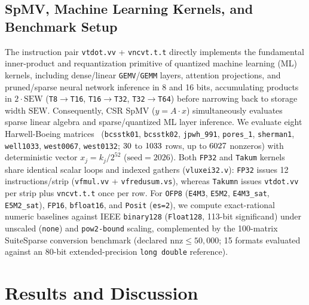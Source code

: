 \documentclass[conference]{IEEEtran}
\begin{document}
\subsection{SpMV, Machine Learning Kernels, and Benchmark Setup}
The instruction pair \texttt{vtdot.vv} + \texttt{vncvt.t.t} directly implements the fundamental inner-product and requantization primitive of quantized machine learning (ML) kernels, including dense/linear \texttt{GEMV}/\texttt{GEMM} layers, attention projections, and pruned/sparse neural network inference in 8 and 16 bits, accumulating products in $2\cdot\mathrm{SEW}$ (\texttt{T8$\to$T16}, \texttt{T16$\to$T32}, \texttt{T32$\to$T64}) before narrowing back to storage width $\mathrm{SEW}$. Consequently, CSR SpMV ($y = A\cdot x$) simultaneously evaluates sparse linear algebra and sparse/quantized ML layer inference. We evaluate eight Harwell-Boeing matrices~\cite{duff1989hb} (\texttt{bcsstk01}, \texttt{bcsstk02}, \texttt{jpwh\_991}, \texttt{pores\_1}, \texttt{sherman1}, \texttt{well1033}, \texttt{west0067}, \texttt{west0132}; $30$ to $1033$ rows, up to $6027$ nonzeros) with deterministic vector $x_j = k_j/2^{52}$ ($\text{seed}=2026$). Both \texttt{FP32} and \texttt{Takum} kernels share identical scalar loops and indexed gathers (\texttt{vluxei32.v}): \texttt{FP32} issues 12 instructions/strip (\texttt{vfmul.vv} + \texttt{vfredusum.vs}), whereas \texttt{Takumn} issues \texttt{vtdot.vv} per strip plus \texttt{vncvt.t.t} once per row. For \texttt{OFP8} (\texttt{E4M3}, \texttt{E5M2}, \texttt{E4M3\_sat}, \texttt{E5M2\_sat}), \texttt{FP16}, \texttt{bfloat16}, and \texttt{Posit} (\texttt{es=2}), we compute exact-rational numeric baselines against IEEE \texttt{binary128} (\texttt{Float128}, 113-bit significand) under unscaled (\texttt{none}) and \texttt{pow2-bound} scaling, complemented by the 100-matrix SuiteSparse conversion benchmark (declared $\mathrm{nnz}\le 50{,}000$; 15 formats evaluated against an 80-bit extended-precision \texttt{long double} reference).

\section{Results and Discussion}



\end{document}
